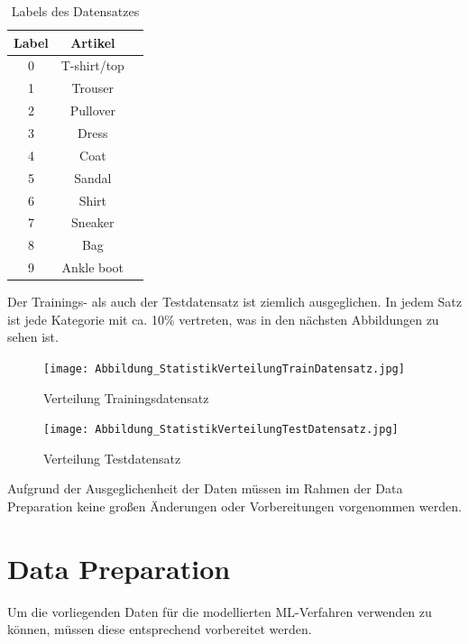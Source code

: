 \documentclass[12pt]{scrreprt}
\begin{document}
\begin{table}[h!]
	\begin{center}
		\begin{tabular}{|c|c|c|}
			\hline
			Label & Artikel \\
			\hline
			0 & T-shirt/top \\
			\hline
			1 & Trouser \\
			\hline
			2 & Pullover \\
			\hline
			3 & Dress \\
			\hline
			4 & Coat \\
			\hline
			5 & Sandal \\
			\hline
			6 & Shirt \\
			\hline
			7 & Sneaker \\
			\hline
			8 & Bag \\
			\hline
			9 & Ankle boot \\
			\hline
		\end{tabular}
		\caption{Labels des Datensatzes}
		\label{tab:labels}
	\end{center}
\end{table}
	
\newpage 
	
Der Trainings- als auch der Testdatensatz ist ziemlich ausgeglichen. In jedem Satz ist jede Kategorie mit ca. 10\% vertreten, was in den nächsten Abbildungen zu sehen ist.
	
\begin{figure}[h!]
	\centering
	\texttt{[image: Abbildung\_StatistikVerteilungTrainDatensatz.jpg]}
	\caption{Verteilung Trainingsdatensatz \cite{Abbildung8}}
	\label{fig:fig8}
\end{figure}
	
\begin{figure}[h!]
	\centering
	\texttt{[image: Abbildung\_StatistikVerteilungTestDatensatz.jpg]}
	\caption{Verteilung Testdatensatz \cite{Abbildung9}}
	\label{fig:fig9}
\end{figure}
\newpage
	
Aufgrund der Ausgeglichenheit der Daten müssen im Rahmen der Data Preparation keine großen Änderungen oder Vorbereitungen vorgenommen werden.
	
\section{Data Preparation}
	
Um die vorliegenden Daten für die modellierten ML-Verfahren verwenden zu können, müssen diese entsprechend vorbereitet werden. 
	
\end{document}
